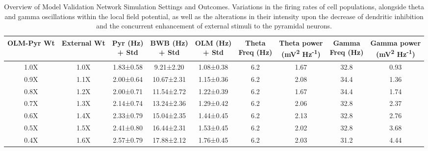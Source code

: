 \begin{table}[htbp]
    \centering
    \caption[Summary of Model validation: Network simulation Parameters and Results]{Overview of Model Validation Network Simulation Settings and Outcomes.
        Variations in the firing rates of cell populations, alongside theta and gamma oscillations within the local field potential, as well as the alterations in their intensity upon the decrease of dendritic inhibition and the concurrent enhancement of external stimuli to the pyramidal neurons.}\label{tab:validation_results}
    \begin{adjustbox}{width=\textwidth}
        \begin{tabular}{ccccccccc}
            \hline
            OLM-Pyr Wt & External Wt & \CellWithForcedBreak{Pyr (Hz)                                                     \\ + Std} & \CellWithForcedBreak{BWB (Hz) \\ + Std} & \CellWithForcedBreak{OLM (Hz) \\ + Std} & \CellWithForcedBreak{Theta \\ Freq (Hz)} & \CellWithForcedBreak{Theta power \\ (mV\textsuperscript{2} Hz\textsuperscript{-1})} & \CellWithForcedBreak{Gamma \\ Freq (Hz)} & \CellWithForcedBreak{Gamma power \\ (mV\textsuperscript{2} Hz\textsuperscript{-1})} \\
            \hline
            1.0X       & 1.0X        & 1.83±0.58                     & 9.21±2.20  & 1.08±0.38 & 6.2 & 1.67 & 32.8 & 0.93 \\
            0.9X       & 1.1X        & 2.00±0.64                     & 10.67±2.31 & 1.15±0.36 & 6.2 & 2.08 & 34.4 & 1.36 \\
            0.8X       & 1.2X        & 2.00±0.71                     & 11.54±2.72 & 1.22±0.39 & 6.2 & 1.67 & 34.4 & 1.74 \\
            0.7X       & 1.3X        & 2.14±0.74                     & 13.24±2.36 & 1.29±0.42 & 6.2 & 2.06 & 32.8 & 2.37 \\
            0.6X       & 1.4X        & 2.33±0.79                     & 15.04±2.35 & 1.44±0.45 & 6.2 & 2.13 & 32.8 & 2.76 \\
            0.5X       & 1.5X        & 2.41±0.80                     & 16.44±2.31 & 1.53±0.45 & 6.2 & 2.02 & 32.8 & 3.68 \\
            0.4X       & 1.6X        & 2.57±0.79                     & 17.88±2.12 & 1.76±0.45 & 6.2 & 2.03 & 31.2 & 4.44 \\

\end{tabular}
\end{adjustbox}
\end{table}
